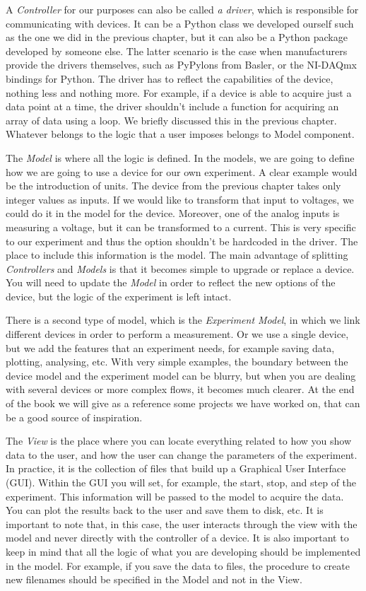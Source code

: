 A \emph{Controller} for our purposes can also be called \emph{a driver}, which is responsible for communicating with devices. It can be a Python class we developed ourself such as the one we did in the previous chapter, but it can also be a Python package developed by someone else. The latter scenario is the case when manufacturers provide the drivers themselves, such as PyPylons from Basler, or the NI-DAQmx bindings for Python. The driver has to reflect the capabilities of the device, nothing less and nothing more. For example, if a device is able to acquire just a data point at a time, the driver shouldn't include a function for acquiring an array of data using a loop. We briefly discussed this in the previous chapter. Whatever belongs to the logic that a user imposes belongs to Model component. 

The \emph{Model} is where all the logic is defined. In the models, we are going to define how we are going to use a device for our own experiment. A clear example would be the introduction of units. The device from the previous chapter takes only integer values as inputs. If we would like to transform that input to voltages, we could do it in the model for the device. Moreover, one of the analog  inputs is measuring a voltage, but it can be transformed to a current. This is very specific to our experiment and thus the option shouldn't be hardcoded in the driver. The place to include this information is the model. The main advantage of splitting \emph{Controllers} and \emph{Models} is that it becomes simple to upgrade or replace a device. You will need to update the \emph{Model} in order to reflect the new options of the device, but the logic of the experiment is left intact. 

There is a second type of model, which is the \emph{Experiment Model}, in which we link different devices in order to perform a measurement. Or we use a single device, but we add the features that an experiment needs, for example saving data, plotting, analysing, etc. With very simple examples, the boundary between the device model and the experiment model can be blurry, but when you are dealing with several devices or more complex flows, it becomes much clearer. At the end of the book we will give as a reference some projects we have worked on, that can be a good source of inspiration.

The \emph{View} is the place where you can locate everything related to how you show data to the user, and how the user can change the parameters of the experiment. In practice, it is the collection of files that build up a Graphical User Interface ({GUI}). Within the {GUI} you will set, for example, the start, stop, and step of the experiment. This information will be passed to the model to acquire the data. You can plot the results back to the user and save them to disk, etc. It is important to note that, in this case, the user interacts through the view with the model and never directly with the controller of a device. It is also important to keep in mind that all the logic of what you are developing should be implemented in the model. For example, if you save the data to files, the procedure to create new filenames should be specified in the Model and not in the View. 

